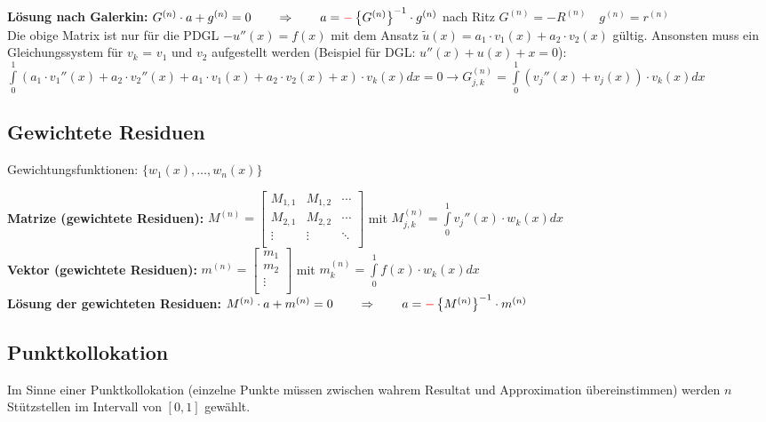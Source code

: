 \textbf{Lösung nach Galerkin:} $G^{(n)}\cdot a+g^{(n)}=0\qquad \Rightarrow
	\qquad a=\textcolor{red}{\mathbf{-}}\left\{G^{(n)}\right\}^{-1}\cdot g^{(n)}$ \quad nach Ritz $G^{(n)} = -R^{(n)} \quad g^{(n)} = r^{(n)}$\\

Die obige Matrix ist nur für die PDGL $-u''(x) = f(x)$ mit dem Ansatz
$\tilde{u}(x) = a_1 \cdot v_1(x) + a_2 \cdot v_2(x)$ gültig. Ansonsten muss ein
Gleichungssystem für $v_k$ = $v_1$ und $v_2$ aufgestellt werden (Beispiel
für DGL: $u''(x) + u(x) + x = 0$):\\
$\int\limits_{0}^{1}{(a_1 \cdot v_1''(x) + a_2 \cdot v_2''(x) + a_1 \cdot
		v_1(x) + a_2 \cdot v_2(x) + x) \cdot v_k(x) dx} = 0 \rightarrow G_{j,k}^{(n)}=\int\limits_{0}^{1}(v_j''(x) + v_j(x))\cdot v_k(x) dx$

\subsection{Gewichtete Residuen}
Gewichtungsfunktionen: $\{w_1(x),\ldots,w_n(x)\}$

\textbf{Matrize (gewichtete Residuen): }
$M^{(n)}=\begin{bmatrix}
		M_{1,1} & M_{1,2} & \cdots \\
		M_{2,1} & M_{2,2} & \cdots \\
		\vdots  & \vdots  & \ddots \\
	\end{bmatrix}$ \qquad mit \qquad $M_{j,k}^{(n)}=\int\limits_{0}^{1}{v_j''(x)\cdot w_k(x) dx}$\\
\textbf{Vektor (gewichtete Residuen): }
$m^{(n)}=\begin{bmatrix}
		m_1    \\
		m_2    \\
		\vdots \\
	\end{bmatrix}$ \qquad mit \qquad $m_{k}^{(n)}=\int\limits_{0}^{1}{f(x)\cdot w_k(x) dx}$\\

\textbf{Lösung der gewichteten Residuen:} $M^{(n)}\cdot a+m^{(n)}=0\qquad \Rightarrow \qquad a=\textcolor{red}{\mathbf{-}}\left\{M^{(n)}\right\}^{-1}\cdot m^{(n)}$

\subsection{Punktkollokation}
Im Sinne einer Punktkollokation (einzelne Punkte müssen zwischen wahrem Resultat und Approximation übereinstimmen) werden $n$ Stützstellen im Intervall von $[0,1]$ gewählt.\\

